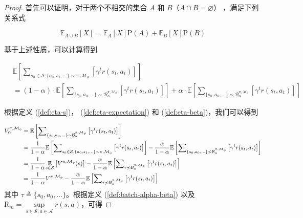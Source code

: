 \begin{proof}


首先可以证明，对于两个不相交的集合 $A$ 和 $B$（$A\cap B=\varnothing$） ，满足下列关系式

\begin{equation}
    \mathbb{E}_{A\cup B}[X] = \mathbb{E}_A[X]\mathrm{P}(A)+\mathbb{E}_B[X]\mathrm{P}(B)
\end{equation}

基于上述性质，可以计算得到

\begin{align*}
    &\mathbb{E}\left[{\sum}_{s_0\in\mathcal{S},\{a_0,s_1,\ldots\} \sim\pi,\mathcal{M}_\phi}\left[\gamma^t r(s_t,a_t)\right]\right] \\
    &= (1-\alpha)\cdot \mathbb{E}\left[{\sum}_{\{s_0,a_0,\ldots\} \sim\mathcal{B}_\alpha^{\pi,\mathcal{M}_\phi}}\left[\gamma^t r(s_t,a_t)\right]\right] + \alpha\cdot\mathbb{E}\left[{\sum}_{\{s_0,a_0,\ldots\} \not\sim\mathcal{B}_\alpha^{\pi,\mathcal{M}_\phi}}\left[\gamma^t r(s_t,a_t)\right]\right]
\end{align*}

根据定义 (\ref{def:eta-s})， (\ref{def:eta-expectation}) 和 (\ref{def:eta-beta})，我们可以得到

\begin{align}
{V}^{\pi,\mathcal{M}_\phi}_\alpha&=\mathbb{E}\left[{\sum}_{\{s_0,a_0,\ldots\} \sim\mathcal{B}_\alpha^{\pi,\mathcal{M}_\phi}}\left[\gamma^t r(s_t,a_t)\right]\right]\notag\\
&=\frac{1}{1-\alpha}\mathbb{E}\left[{\sum}_{s_0\in\mathcal{S},\{a_0,s_1,\ldots\} \sim\pi,\mathcal{M}_\phi}\left[\gamma^t r(s_t,a_t)\right]\right]-\frac{\alpha}{1-\alpha}\mathbb{E}\left[{\sum}_{\{s_0,a_0,\ldots\} \not\sim\mathcal{B}_\alpha^{\pi,\mathcal{M}_\phi}}\left[\gamma^t r(s_t,a_t)\right]\right]\notag\\
&=\frac{1}{1-\alpha}\underset{s\in{\mathcal{S}}}{\mathbb{E}}\left[{V}^{\pi,\mathcal{M}_\phi}(s)\right]-\frac{\alpha}{1-\alpha}\mathbb{E}\left[{\sum}_{\tau \not\sim\mathcal{B}_\alpha^{\pi,\mathcal{M}_\phi}}\left[\gamma^t r(s_t,a_t)\right]\right]\notag\\
&=\frac{1}{1-\alpha}{V}^{\pi,\mathcal{M}_\phi}-\frac{\alpha}{1-\alpha}\mathbb{E}\left[{\sum}_{\tau \not\sim\mathcal{B}_\alpha^{\pi,\mathcal{M}_\phi}}\left[\gamma^t r(s_t,a_t)\right]\right]\label{proof:lem42p1}
\end{align}
其中 $\tau\triangleq\{s_0,a_0,\ldots\}$。根据定义 (\ref{def:batch-alpha-beta}) 以及  $\mathrm{R}_{m}=\underset{s\in\mathcal{S},a\in\mathcal{A}}{\sup}r(s,a)$，可得


\end{proof}
